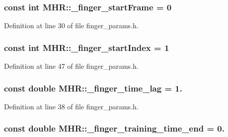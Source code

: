 \hypertarget{namespace_m_h_r_a9b0e8542961b24a5dc2e1f77df715b51}{
\subsubsection[{\+\_\+finger\+\_\+start\+Frame}]{\setlength{\rightskip}{0pt plus 5cm}const int M\+H\+R\+::\+\_\+finger\+\_\+start\+Frame = 0}}\label{namespace_m_h_r_a9b0e8542961b24a5dc2e1f77df715b51}


Definition at line 30 of file finger\+\_\+params.\+h.

\hypertarget{namespace_m_h_r_a25e5a8e8b0d72f6cfa98fa75e943f35e}{
\subsubsection[{\+\_\+finger\+\_\+start\+Index}]{\setlength{\rightskip}{0pt plus 5cm}const int M\+H\+R\+::\+\_\+finger\+\_\+start\+Index = 1}}\label{namespace_m_h_r_a25e5a8e8b0d72f6cfa98fa75e943f35e}


Definition at line 47 of file finger\+\_\+params.\+h.

\hypertarget{namespace_m_h_r_ae2523999aef7718ac3e6edeb318edf8a}{
\subsubsection[{\+\_\+finger\+\_\+time\+\_\+lag}]{\setlength{\rightskip}{0pt plus 5cm}const double M\+H\+R\+::\+\_\+finger\+\_\+time\+\_\+lag = 1.}}\label{namespace_m_h_r_ae2523999aef7718ac3e6edeb318edf8a}


Definition at line 38 of file finger\+\_\+params.\+h.

\hypertarget{namespace_m_h_r_a69b9408e97af3e5261c4ede559d9f7d6}{
\subsubsection[{\+\_\+finger\+\_\+training\+\_\+time\+\_\+end}]{\setlength{\rightskip}{0pt plus 5cm}const double M\+H\+R\+::\+\_\+finger\+\_\+training\+\_\+time\+\_\+end = 0.}}\label{namespace_m_h_r_a69b9408e97af3e5261c4ede559d9f7d6}


